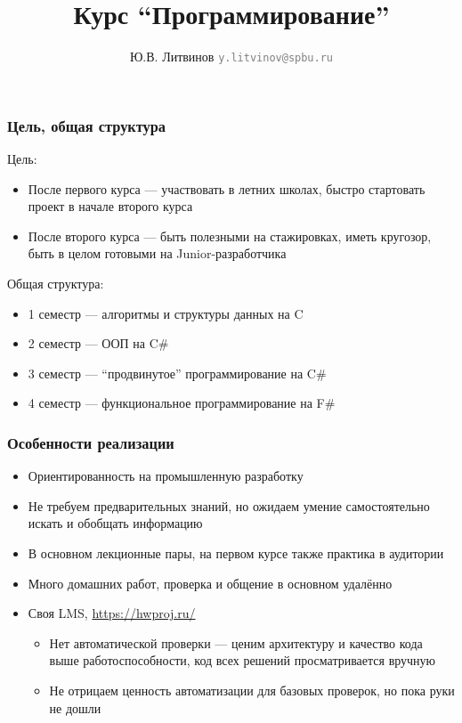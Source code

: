 \documentclass[xetex,mathserif,serif]{beamer}
\title{Курс ``Программирование''}
\author[Юрий Литвинов]{Ю.В. Литвинов \newline 
    \textcolor{gray}{\small\texttt{y.litvinov@spbu.ru}}
}
\date{}
\begin{document}
    \maketitle

    \begin{frame}
        \frametitle{Цель, общая структура}
        Цель:
        \begin{itemize}
            \item После первого курса --- участвовать в летних школах, быстро стартовать проект в начале второго курса
            \item После второго курса --- быть полезными на стажировках, иметь кругозор, быть в целом готовыми на Junior-разработчика
        \end{itemize}
        Общая структура:
        \begin{itemize}
            \item 1 семестр --- алгоритмы и структуры данных на C
            \item 2 семестр --- ООП на C\#
            \item 3 семестр --- ``продвинутое'' программирование на C\#
            \item 4 семестр --- функциональное программирование на F\#
        \end{itemize}
    \end{frame}

    \begin{frame}
        \frametitle{Особенности реализации}
        \begin{itemize}
            \item Ориентированность на промышленную разработку
            \item Не требуем предварительных знаний, но ожидаем умение самостоятельно искать и обобщать информацию
            \item В основном лекционные пары, на первом курсе также практика в аудитории
            \item Много домашних работ, проверка и общение в основном удалённо
            \item Своя LMS, \url{https://hwproj.ru/}
            \begin{itemize}
                \item Нет автоматической проверки --- ценим архитектуру и качество кода выше работоспособности, код всех решений просматривается вручную
                \item Не отрицаем ценность автоматизации для базовых проверок, но пока руки не дошли
            \end{itemize}
        \end{itemize}
    \end{frame}
\end{document}
